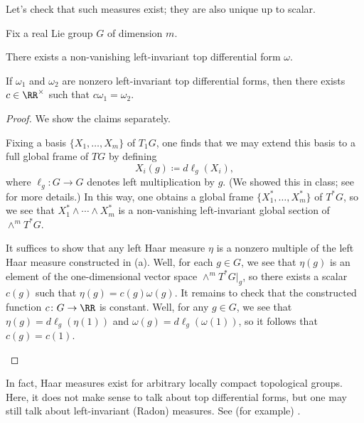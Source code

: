 \documentclass[notes.tex]{subfiles}
\begin{document}
Let's check that such measures exist; they are also unique up to scalar.
\begin{proposition} \label{prop:haar-unique}
	Fix a real Lie group $G$ of dimension $m$.
	\begin{listalph}
		\item There exists a non-vanishing left-invariant top differential form $\omega$.
		\item If $\omega_1$ and $\omega_2$ are nonzero left-invariant top differential forms, then there exists $c\in\RR^\times$ such that $c\omega_1=\omega_2$.
	\end{listalph}
\end{proposition}
\begin{proof}
	We show the claims separately.
	\begin{listalph}
		\item Fixing a basis $\{X_1,\ldots,X_m\}$ of $T_1G$, one finds that we may extend this basis to a full global frame of $TG$ by defining
		\[X_i(g)\coloneqq d\ell_g(X_i),\]
		where $\ell_g\colon G\to G$ denotes left multiplication by $g$. (We showed this in class; see \cite[Theorem~8.37]{lee-manifolds} for more details.) In this way, one obtains a global frame $\{X_1^*,\ldots,X_m^*\}$ of $T^*G$, so we see that $X_1^*\land\cdots\land X_m^*$ is a non-vanishing left-invariant global section of $\land^mT^*G$.
		\item It suffices to show that any left Haar measure $\eta$ is a nonzero multiple of the left Haar measure constructed in (a). Well, for each $g\in G$, we see that $\eta(g)$ is an element of the one-dimensional vector space $\land^mT^*G|_g$, so there exists a scalar $c(g)$ such that $\eta(g)=c(g)\omega(g)$. It remains to check that the constructed function $c\colon G\to\RR$ is constant. Well, for any $g\in G$, we see that $\eta(g)=d\ell_g(\eta(1))$ and $\omega(g)=d\ell_g(\omega(1))$, so it follows that $c(g)=c(1)$.
		\qedhere
	\end{listalph}
\end{proof}
\begin{remark}
	In fact, Haar measures exist for arbitrary locally compact topological groups. Here, it does not make sense to talk about top differential forms, but one may still talk about left-invariant (Radon) measures. See (for example) \cite[Chapter~1]{de-harmonic-analysis}.
\end{remark}
\end{document}
